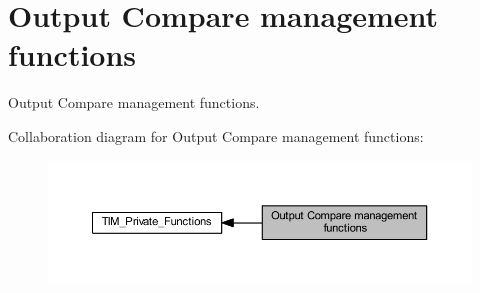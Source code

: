 \hypertarget{group___t_i_m___group2}{}\section{Output Compare management functions}
\label{group___t_i_m___group2}


Output Compare management functions.  


Collaboration diagram for Output Compare management functions\+:
\nopagebreak
\begin{figure}[H]
\begin{center}
\leavevmode
\includegraphics[width=350pt]{group___t_i_m___group2}
\end{center}
\end{figure}

